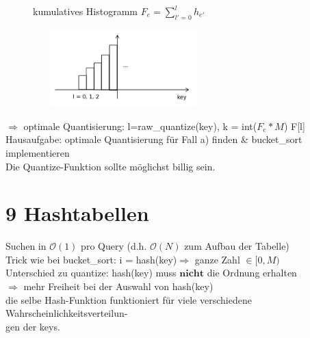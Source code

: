 \documentclass[11pt, fleqn]{scrreprt}
\newcommand{\bigO}[0]{\mathcal{O}}
\begin{document}
\begin {enumerate}
        \begin{figure}[htbp]
            \begin{minipage}[t]{10cm}
                \centering
                \vspace{-1cm}
                kumulatives Histogramm $F_e = \sum_{l' = 0}^{l} h_{e'}$ \\
            \end{minipage}
            \begin{minipage}[t]{6cm}
                \hspace*{-1cm}\includegraphics[width=7cm,height=3cm,keepaspectratio]{./Pictures/Balken2.png}\\
            \end{minipage}
        \end{figure}


        $\Rightarrow$ optimale Quantisierung: \hspace*{5mm} l=raw\_quantize(key),
        k = int($F_e * M$)\hspace*{5mm}  F[l] \\

        Hausaufgabe: optimale Quantisierung für Fall a) finden \& bucket\_sort implementieren \\
        Die Quantize-Funktion sollte möglichst billig sein.
\end{enumerate}

\chapter*{9 Hashtabellen}
Suchen in $\bigO{}(1)$ pro Query (d.h. $\bigO{}(N)$ zum Aufbau der Tabelle) \\

Trick wie bei bucket\_sort: i = hash(key)$\Rightarrow$ ganze Zahl $\in [0,M)$ \\
\hspace*{5mm} Unterschied zu quantize: hash(key) muss $\textbf{nicht}$ die Ordnung erhalten\\
\hspace*{10mm} $\Rightarrow$ mehr Freiheit bei der Auswahl von hash(key)\\
\hspace*{15mm} die selbe Hash-Funktion funktioniert für viele verschiedene Wahrscheinlichkeitsverteilun- \\
\hspace*{15mm} gen der keys.\\
\end{document}
